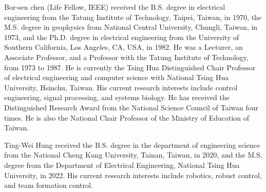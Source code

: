 \documentclass{ieeeaccess}
\begin{document}



\begin{IEEEbiography}{Bor-sen chen}
    (Life Fellow, IEEE) received the B.S. degree in electrical engineering from the Tatung Institute of Technology, Taipei, Taiwan, in 1970, the M.S. degree in geophysics from National Central University, Chungli, Taiwan, in 1973, and the Ph.D. degree in electrical engineering from the University of Southern California, Los Angeles, CA, USA, in 1982. He was a Lecturer, an Associate Professor, and a Professor with the Tatung Institute of Technology, from 1973 to 1987. He is currently the Tsing Hua Distinguished Chair Professor of electrical engineering and computer science with National Tsing Hua University, Hsinchu, Taiwan. His current research interests include control engineering, signal processing, and systems biology. He has received the Distinguished Research Award from the National Science Council of Taiwan four times. He is also the National Chair Professor of the Ministry of Education of Taiwan.
\end{IEEEbiography}
    
\begin{IEEEbiography}{Ting-Wei Hung}
    received the B.S. degree in the department of engineering science from the National Cheng Kung University, Tainan, Taiwan, in 2020, and the M.S. degree from the Department of Electrical Engineering, National Tsing Hua University, in 2022. His current research interests include robotics, robust control, and team formation control.
\end{IEEEbiography}

\EOD
\end{document}
